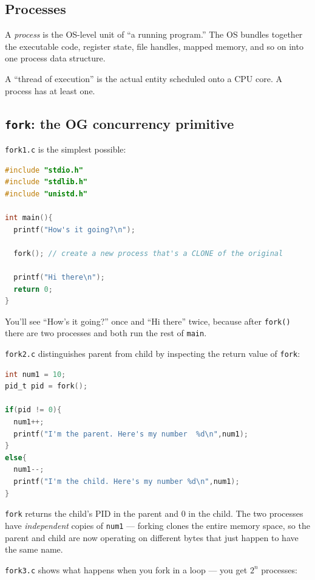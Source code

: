 \documentclass[11pt]{article}
\begin{document}
\subsection*{Processes}

A \emph{process} is the OS-level unit of ``a running program.''
The OS bundles together the executable code, register state,
file handles, mapped memory, and so on into one process data
structure.

A ``thread of execution'' is the actual entity scheduled onto a CPU
core. A process has at least one.

\subsection*{\texttt{fork}: the OG concurrency primitive}

\texttt{fork1.c} is the simplest possible:

\begin{lstlisting}[language=C]
#include "stdio.h"
#include "stdlib.h"
#include "unistd.h"

int main(){
  printf("How's it going?\n");

  fork(); // create a new process that's a CLONE of the original

  printf("Hi there\n");
  return 0;
}
\end{lstlisting}

You'll see ``How's it going?'' once and ``Hi there'' twice, because
after \texttt{fork()} there are two processes and both run the rest
of \texttt{main}.

\texttt{fork2.c} distinguishes parent from child by inspecting the
return value of \texttt{fork}:

\begin{lstlisting}[language=C]
int num1 = 10;
pid_t pid = fork();

if(pid != 0){
  num1++;
  printf("I'm the parent. Here's my number  %d\n",num1);
}
else{
  num1--;
  printf("I'm the child. Here's my number %d\n",num1);
}
\end{lstlisting}

\texttt{fork} returns the child's PID in the parent and 0 in the
child. The two processes have \emph{independent} copies of
\texttt{num1} --- forking clones the entire memory space, so the
parent and child are now operating on different bytes that just
happen to have the same name.

\texttt{fork3.c} shows what happens when you fork in a loop ---
you get $2^n$ processes:
\end{document}
